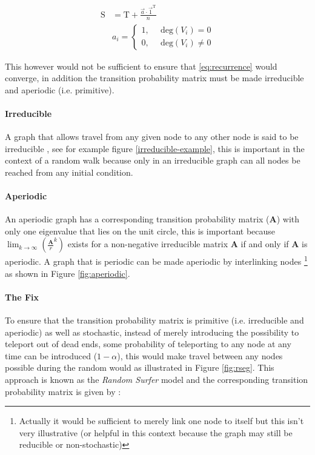 \documentclass[11pt, twoside]{report}
\begin{document}
\begin{align}
\mathrm{S} &= \mathrm{T}+ \frac{\vec{a} \cdot \vec{1}^{\mathrm{T}} }{n} \label{eq:nearly-random-surfer} \\
& a_{i} = \begin{cases}
    1      , &\enspace \mathrm{deg}\left( V_{i}\right) = 0  \\
    0      , &\enspace \mathrm{deg}\left( V_{i}\right) \neq 0
\end{cases}
\end{align}

This however would not be sufficient to ensure that \eqref{eq:recurrence} would converge, in addition the transition probability matrix must be made irreducible and aperiodic (i.e. primitive). \cite{langvilleGooglePageRankScience2012}


\paragraph{Irreducible}
\label{sec:org578c303}
A graph that allows travel from any given node to any other node is said to be irreducible \cite{langvilleGooglePageRankScience2012}, see for example figure \ref{irreducible-example}, this is important in the context of a random walk because only in an irreducible graph can all nodes be reached from any initial condition.


\paragraph{Aperiodic}
\label{sec:org2c6170b}
An aperiodic graph has a corresponding transition probability matrix (\(\mathbf{A}\)) with only one eigenvalue that lies on the unit circle, this is important because \(\lim_{k\rightarrow \infty} \left( \frac{\mathbf{A}}{r}^{k} \right)\) exists for a non-negative irreducible matrix \(\mathbf{A}\) if and only if \(\mathbf{A}\) is aperiodic. A graph that is periodic can be made aperiodic by interlinking nodes \footnote{Actually it would be sufficient to merely link one node to itself \cite[]{langvilleGooglePageRankScience2012} but this isn't very illustrative (or helpful in this context because the graph may still be reducible or non-stochastic)} as shown in Figure \ref{fig:aperiodic}.


\paragraph{The Fix}
\label{fix}
To ensure that the transition probability matrix is primitive (i.e. irreducible
and aperiodic) as well as stochastic, instead of merely introducing the
possibility to teleport out of dead ends, some probability of teleporting to any
node at any time can be introduced (\(1- \alpha\)), this would make travel between any nodes possible during the random would as illustrated in Figure \ref{fig:rseg}. This
approach is known as the \emph{Random Surfer} model and the corresponding
transition probability matrix is given by
\cite{larrypageAnatomyLargescaleHypertextual1998} :
\end{document}
